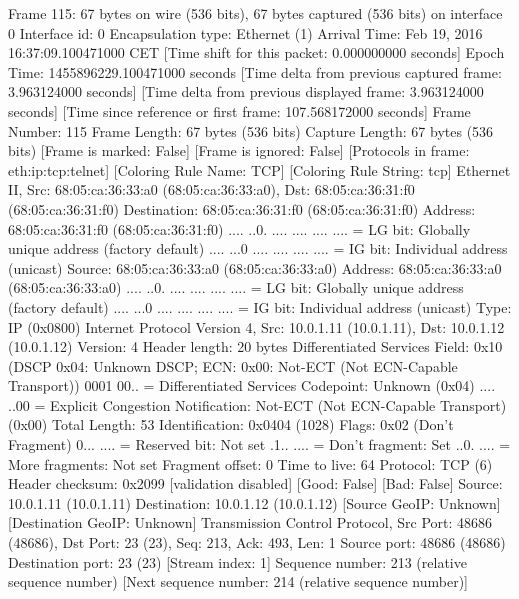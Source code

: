 Frame 115: 67 bytes on wire (536 bits), 67 bytes captured (536 bits) on interface 0
    Interface id: 0
    Encapsulation type: Ethernet (1)
    Arrival Time: Feb 19, 2016 16:37:09.100471000 CET
    [Time shift for this packet: 0.000000000 seconds]
    Epoch Time: 1455896229.100471000 seconds
    [Time delta from previous captured frame: 3.963124000 seconds]
    [Time delta from previous displayed frame: 3.963124000 seconds]
    [Time since reference or first frame: 107.568172000 seconds]
    Frame Number: 115
    Frame Length: 67 bytes (536 bits)
    Capture Length: 67 bytes (536 bits)
    [Frame is marked: False]
    [Frame is ignored: False]
    [Protocols in frame: eth:ip:tcp:telnet]
    [Coloring Rule Name: TCP]
    [Coloring Rule String: tcp]
Ethernet II, Src: 68:05:ca:36:33:a0 (68:05:ca:36:33:a0), Dst: 68:05:ca:36:31:f0 (68:05:ca:36:31:f0)
    Destination: 68:05:ca:36:31:f0 (68:05:ca:36:31:f0)
        Address: 68:05:ca:36:31:f0 (68:05:ca:36:31:f0)
        .... ..0. .... .... .... .... = LG bit: Globally unique address (factory default)
        .... ...0 .... .... .... .... = IG bit: Individual address (unicast)
    Source: 68:05:ca:36:33:a0 (68:05:ca:36:33:a0)
        Address: 68:05:ca:36:33:a0 (68:05:ca:36:33:a0)
        .... ..0. .... .... .... .... = LG bit: Globally unique address (factory default)
        .... ...0 .... .... .... .... = IG bit: Individual address (unicast)
    Type: IP (0x0800)
Internet Protocol Version 4, Src: 10.0.1.11 (10.0.1.11), Dst: 10.0.1.12 (10.0.1.12)
    Version: 4
    Header length: 20 bytes
    Differentiated Services Field: 0x10 (DSCP 0x04: Unknown DSCP; ECN: 0x00: Not-ECT (Not ECN-Capable Transport))
        0001 00.. = Differentiated Services Codepoint: Unknown (0x04)
        .... ..00 = Explicit Congestion Notification: Not-ECT (Not ECN-Capable Transport) (0x00)
    Total Length: 53
    Identification: 0x0404 (1028)
    Flags: 0x02 (Don't Fragment)
        0... .... = Reserved bit: Not set
        .1.. .... = Don't fragment: Set
        ..0. .... = More fragments: Not set
    Fragment offset: 0
    Time to live: 64
    Protocol: TCP (6)
    Header checksum: 0x2099 [validation disabled]
        [Good: False]
        [Bad: False]
    Source: 10.0.1.11 (10.0.1.11)
    Destination: 10.0.1.12 (10.0.1.12)
    [Source GeoIP: Unknown]
    [Destination GeoIP: Unknown]
Transmission Control Protocol, Src Port: 48686 (48686), Dst Port: 23 (23), Seq: 213, Ack: 493, Len: 1
    Source port: 48686 (48686)
    Destination port: 23 (23)
    [Stream index: 1]
    Sequence number: 213    (relative sequence number)
    [Next sequence number: 214    (relative sequence number)]
